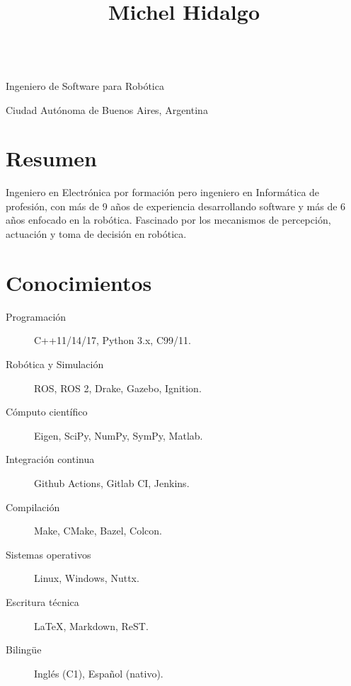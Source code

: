 \documentclass[spanish, letterpaper]{resume}
\begin{document}
\begin{center}
  \title{Michel Hidalgo} \\
  Ingeniero de Software para Robótica \\
  \address{Buenos Aires}{
    Ciudad Autónoma de Buenos Aires,
    Argentina} \\
  \begin{inlined}
    \item {}
    \item {}
    \item {}
  \end{inlined}
\end{center}

\section*{Resumen}

Ingeniero en Electrónica por formación pero ingeniero en Informática de profesión, con más de 9 años de experiencia desarrollando software y más de 6 años enfocado en la robótica. Fascinado por los mecanismos de percepción, actuación y toma de decisión en robótica.

\section*{Conocimientos}

\hfill
\begin{minipage}{0.55\linewidth}
  \begin{description}
    \item[Programación] C++11/14/17, Python 3.x, C99/11.
    \item[Robótica y Simulación] ROS, ROS 2, Drake, Gazebo, Ignition.
    \item[Cómputo científico] Eigen, SciPy, NumPy, SymPy, Matlab.
    \item[Integración continua] Github Actions, Gitlab CI, Jenkins.
  \end{description}
\end{minipage}\hfill
\begin{minipage}{0.4\linewidth}
  \begin{description}
    \item[Compilación] Make, CMake, Bazel, Colcon.
    \item[Sistemas operativos] Linux, Windows, Nuttx.
    \item[Escritura técnica] La\TeX, Markdown, ReST.
    \item[Bilingüe] Inglés (C1), Español (nativo).
  \end{description}
\end{minipage}
\hfill
\end{document}
